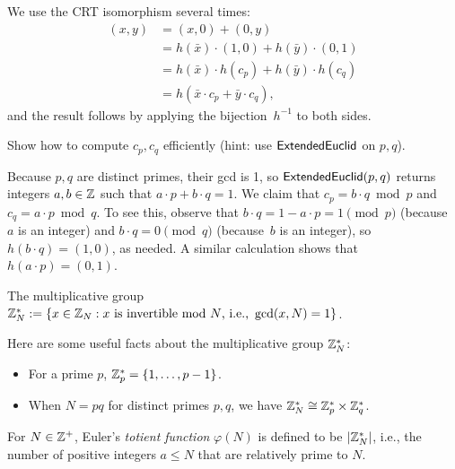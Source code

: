 \documentclass[11pt]{article}
\begin{document}
\begin{answer}
  We use the CRT isomorphism several times:
  \begin{align*}
    (x,y) &= (x, 0) + (0, y) \\
          &= h(\bar{x}) \cdot (1,0) + h(\bar{y}) \cdot (0,1) \\
          &= h(\bar{x}) \cdot h(c_p) + h(\bar{y}) \cdot h(c_q) \\
          &= h(\bar{x} \cdot c_p + \bar{y} \cdot c_q),
  \end{align*}
  and the result follows by applying the bijection~$h^{-1}$ to both
  sides.
\end{answer}

\begin{question}
  Show how to compute $c_{p}, c_{q}$ efficiently (hint: use
  $\mathsf{ExtendedEuclid}$ on $p,q$).
\end{question}

\begin{answer}
  Because $p,q$ are distinct primes, their gcd is 1, so
  $\mathsf{ExtendedEuclid}(p,q)$ returns integers $a,b \in \mathbb{Z}$ such that
  $a \cdot p + b \cdot q = 1$. We claim that
  $c_{p} = b \cdot q \bmod{p}$ and $c_{q} = a \cdot p \bmod{q}$. To
  see this, observe that $b \cdot q = 1 - a \cdot p = 1 \pmod{p}$
  (because~$a$ is an integer) and $b \cdot q = 0 \pmod{q}$
  (because~$b$ is an integer), so $h(b \cdot q) = (1,0)$, as needed. A
  similar calculation shows that $h(a \cdot p) = (0,1)$.
\end{answer}

\begin{definition}
  The multiplicative group $\mathbb{Z}_N^{*} := \{ x \in \mathbb{Z}_N : x \text{
      is invertible mod $N$, i.e., } \gcd(x,N) = 1 \}$.
\end{definition}

\noindent Here are some useful facts about the multiplicative group
$\mathbb{Z}_N^{*}$:
\begin{itemize}
\item For a prime $p$, $\mathbb{Z}_p^{*} = \{1, \ldots, p-1\}$.
\item When $N=pq$ for distinct primes $p,q$, we have $\mathbb{Z}^{*}_N \cong
  \mathbb{Z}_p^{*} \times \mathbb{Z}_q^{*}$.
\end{itemize}

\begin{definition}
  For $N \in \mathbb{Z}^+$, Euler's \emph{totient function} $\varphi(N)$ is
  defined to be $\lvert\mathbb{Z}_N^{*}\rvert$, i.e., the number of positive integers
  $a \leq N$ that are relatively prime to $N$.
\end{definition}
\end{document}
